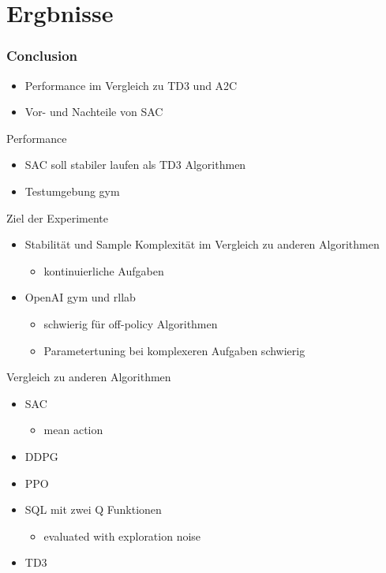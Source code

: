 \section*{Ergbnisse}
\begin{frame}
    \frametitle{Conclusion}
    \begin{itemize}    
        \item Performance im Vergleich zu TD3 und A2C
        \item Vor- und Nachteile von SAC
    \end{itemize}
\end{frame}

\begin{frame}{Performance}
    \begin{itemize}
        \item SAC soll stabiler laufen als TD3 Algorithmen
        \item Testumgebung gym
    \end{itemize}    
\end{frame}


\begin{frame}{Ziel der Experimente}
        \begin{itemize}
            \item Stabilität und Sample Komplexität im Vergleich zu anderen Algorithmen
            \begin{itemize}
                \item kontinuierliche Aufgaben
            \end{itemize}  
            \item OpenAI gym und rllab
            \begin{itemize}
                \item schwierig für off-policy Algorithmen
                \item Parametertuning bei komplexeren Aufgaben schwierig
            \end{itemize}
        \end{itemize}
\end{frame}

\begin{frame}{Vergleich zu anderen Algorithmen}
    \begin{itemize}
        \item SAC
        \begin{itemize}
            \item mean action
        \end{itemize} 
        \item DDPG
        \item PPO
        \item SQL mit zwei Q Funktionen
        \begin{itemize}
            \item evaluated with exploration noise
        \end{itemize}
        \item TD3
    \end{itemize}
        
\end{frame}

